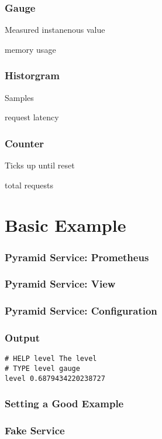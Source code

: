 \begin{frame}
\frametitle{Gauge}

Measured instanenous value\pause

memory usage

\end{frame}

\begin{frame}
\frametitle{Historgram}

Samples\pause

request latency

\end{frame}

\begin{frame}
\frametitle{Counter}

Ticks up until reset\pause

total requests

\end{frame}

\section{Basic Example}

\begin{frame}
\frametitle{Pyramid Service: Prometheus}

\end{frame}

\begin{frame}
\frametitle{Pyramid Service: View}

\end{frame}

\begin{frame}
\frametitle{Pyramid Service: Configuration}

\end{frame}

\begin{frame}
\frametitle{Output}
\begin{lstlisting}
# HELP level The level
# TYPE level gauge
level 0.6879434220238727
\end{lstlisting}
\end{frame}

\begin{frame}
\frametitle{Setting a Good Example}
\end{frame}

\begin{frame}
\frametitle{Fake Service}
\end{frame}

